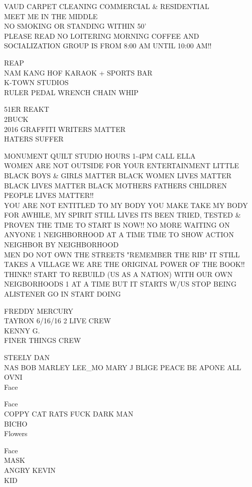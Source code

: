 \documentclass[10pt,letterpaper]{article}
\begin{document}
VAUD CARPET CLEANING COMMERCIAL \& RESIDENTIAL\\
MEET ME IN THE MIDDLE\\
NO SMOKING OR STANDING WITHIN 50'\\
PLEASE READ NO LOITERING MORNING COFFEE AND SOCIALIZATION GROUP IS FROM 8:00 AM UNTIL 10:00 AM!!

REAP\\
NAM KANG HOF KARAOK + SPORTS BAR\\
K{-}TOWN STUDIOS\\
RULER PEDAL WRENCH CHAIN WHIP

51ER REAKT\\
2BUCK\\
2016 GRAFFITI WRITERS MATTER\\
HATERS SUFFER

MONUMENT QUILT STUDIO HOURS 1{-}4PM CALL ELLA\\
WOMEN ARE NOT OUTSIDE FOR YOUR ENTERTAINMENT LITTLE BLACK BOYS \& GIRLS MATTER BLACK WOMEN LIVES MATTER BLACK LIVES MATTER BLACK MOTHERS FATHERS CHILDREN PEOPLE LIVES MATTER!!\\
YOU ARE NOT ENTITLED TO MY BODY YOU MAKE TAKE MY BODY FOR AWHILE, MY SPIRIT STILL LIVES ITS BEEN TRIED, TESTED \& PROVEN THE TIME TO START IS NOW!!  NO MORE WAITING ON ANYONE 1 NEIGHBORHOOD AT A TIME TIME TO SHOW ACTION NEIGHBOR BY NEIGHBORHOOD\\
MEN DO NOT OWN THE STREETS "REMEMBER THE RIB" IT STILL TAKES A VILLAGE WE ARE THE ORIGINAL POWER OF THE BOOK!! THINK!! START TO REBUILD (US AS A NATION) WITH OUR OWN NEIGBORHOODS 1 AT A TIME BUT IT STARTS W/US STOP BEING ALISTENER GO IN START DOING

FREDDY MERCURY\\
TAYRON 6/16/16 2 LIVE CREW\\
KENNY G.\\
FINER THINGS CREW

STEELY DAN\\
NAS BOB MARLEY LEE\_MO MARY J BLIGE PEACE BE APONE ALL\\
OVNI\\
Face

Face\\
COPPY CAT RATS FUCK DARK MAN\\
BICHO\\
Flowers

Face\\
MASK\\
ANGRY KEVIN\\
KID
\end{document}
